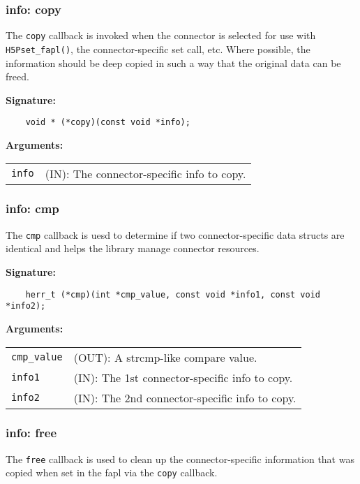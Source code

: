 \subsubsection{info: copy}
The \texttt{copy} callback is invoked when the connector is selected for use with \texttt{H5Pset\_fapl()}, the connector-specific set call, etc. Where possible, the information should be deep copied in such a way that the original data can be freed.

\begin{mdframed}[style=bgbox]
\textbf{Signature:}
\begin{lstlisting}
    void * (*copy)(const void *info);
\end{lstlisting}
\textbf{Arguments:}\\
\begin{tabular}{l p{13.5cm}}
  \texttt{info} & (IN): The connector-specific info to copy.\\
\end{tabular}
\end{mdframed}

\subsubsection{info: cmp}
The \texttt{cmp} callback is uesd to determine if two connector-specific data structs are identical and helps the library manage connector resources.

\begin{mdframed}[style=bgbox]
\textbf{Signature:}
\begin{lstlisting}
    herr_t (*cmp)(int *cmp_value, const void *info1, const void *info2);
\end{lstlisting}
\textbf{Arguments:}\\
\begin{tabular}{l p{13.5cm}}
  \texttt{cmp\_value} & (OUT): A strcmp-like compare value.\\
  \texttt{info1} & (IN): The 1st connector-specific info to copy.\\
  \texttt{info2} & (IN): The 2nd connector-specific info to copy.\\
\end{tabular}
\end{mdframed}

\subsubsection{info: free}
The \texttt{free} callback is used to clean up the connector-specific information that was copied when set in the fapl via the \texttt{copy} callback.

